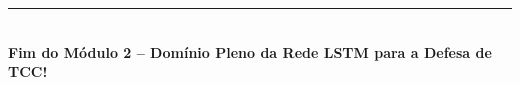 \documentclass[11pt,a4paper]{article}
\begin{document}
\vspace{0.6cm}
\begin{center}
  \rule{0.6\textwidth}{0.8pt}\\[0.2cm]
  \small\textbf{\textsf{Fim do Módulo 2 -- Domínio Pleno da Rede LSTM para a Defesa de TCC!}}
\end{center}
\end{document}
